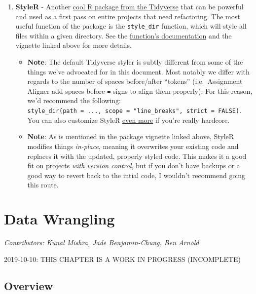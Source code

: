 \documentclass[]{book}
\providecommand{\tightlist}{%
  \setlength{\itemsep}{0pt}\setlength{\parskip}{0pt}}
\begin{document}
\begin{enumerate}
\def\labelenumi{\arabic{enumi}.}
\setcounter{enumi}{2}
\tightlist
\item
  \textbf{StyleR} - Another \href{https://www.tidyverse.org/articles/2017/12/styler-1.0.0/}{cool R package from the Tidyverse} that can be powerful and used as a first pass on entire projects that need refactoring. The most useful function of the package is the \texttt{style\_dir} function, which will style all files within a given directory. See the \href{https://www.rdocumentation.org/packages/styler/versions/1.1.0/topics/style_dir}{function's documentation} and the vignette linked above for more details.

  \begin{itemize}
  \tightlist
  \item
    \textbf{Note}: The default Tidyverse styler is subtly different from some of the things we've advocated for in this document. Most notably we differ with regards to the number of spaces before/after ``tokens'' (i.e.~Assignment Aligner add spaces before \texttt{=} signs to align them properly). For this reason, we'd recommend the following: \texttt{style\_dir(path\ =\ ...,\ scope\ =\ "line\_breaks",\ strict\ =\ FALSE)}. You can also customize StyleR \href{http://styler.r-lib.org/articles/customizing_styler.html}{even more} if you're really hardcore.
  \item
    \textbf{Note}: As is mentioned in the package vignette linked above, StyleR modifies things \emph{in-place}, meaning it overwrites your existing code and replaces it with the updated, properly styled code. This makes it a good fit on projects \emph{with version control}, but if you don't have backups or a good way to revert back to the intial code, I wouldn't recommend going this route.
  \end{itemize}
\end{enumerate}

\hypertarget{datawrangling}{%
\chapter{Data Wrangling}\label{datawrangling}}

\emph{Contributors: Kunal Mishra, Jade Benjamin-Chung, Ben Arnold}

2019-10-10: THIS CHAPTER IS A WORK IN PROGRESS (INCOMPLETE)

\hypertarget{overview}{%
\section{Overview}\label{overview}}
\end{document}
